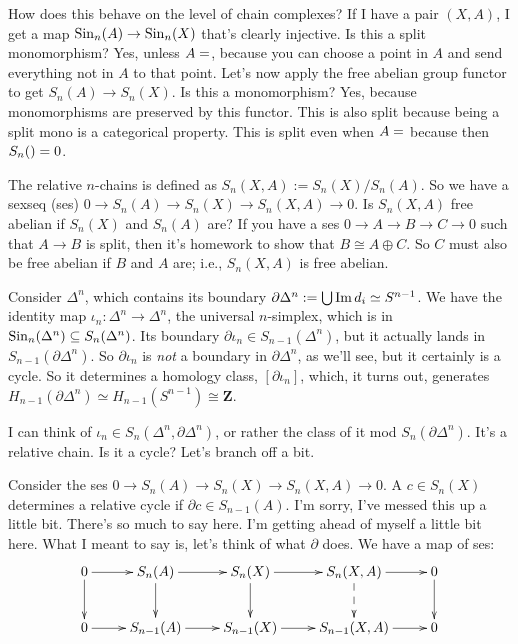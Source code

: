 How does this behave on the level of chain complexes? If I have a pair $(X,A)$, I get a map $\mathrm{Sin}_n(A)\to \mathrm{Sin}_n(X)$ that's clearly injective. Is this a split monomorphism? Yes, unless $A=\empty$, because you can choose a point in $A$ and send everything not in $A$ to that point. Let's now apply the free abelian group functor to get $S_n(A)\to S_n(X)$. Is this a monomorphism? Yes, because monomorphisms are preserved by this functor. This is also split because being a split mono is a categorical property. This is split even when $A=\empty$ because then $S_n(\empty)=0$.
\begin{definition}
The relative $n$-chains is defined as $S_n(X,A):= S_n(X)/S_n(A)$. So we have a sexseq (ses) $0\to S_n(A)\to S_n(X)\to S_n(X,A)\to 0$. Is $S_n(X,A)$ free abelian if $S_n(X)$ and $S_n(A)$ are? If you have a ses $0\to A\to B\to C\to 0$ such that $A\to B$ is split, then it's homework to show that $B\cong A\oplus C$. So $C$ must also be free abelian if $B$ and $A$ are; i.e., $S_n(X,A)$ is free abelian.
\end{definition}
\begin{example}
Consider $\Delta^n$, which contains its boundary $\partial\Delta^n:=\bigcup \operatorname{Im} d_i\simeq S^{n-1}$. We have the identity map $\iota_n:\Delta^n\to \Delta^n$, the universal $n$-simplex, which is in $\mathrm{Sin}_n(\Delta^n)\subseteq S_n(\Delta^n)$. Its boundary $\partial\iota_n\in S_{n-1}(\Delta^n)$, but it actually lands in $S_{n-1}(\partial\Delta^n)$. So $\partial\iota_n$ is \emph{not} a boundary in $\partial\Delta^n$, as we'll see, but it certainly is a cycle. So it determines a homology class, $[\partial\iota_n]$, which, it turns out, generates $ H_{n-1}(\partial\Delta^n)\simeq H_{n-1}(S^{n-1})\cong\mathbf{Z}$.

I can think of $\iota_n\in S_n(\Delta^n,\partial\Delta^n)$, or rather the class of it mod $S_n(\partial\Delta^n)$. It's a relative chain. Is it a cycle? Let's branch off a bit.
\end{example}
Consider the ses $0\to S_n(A)\to S_n(X)\to S_n(X,A)\to 0$. A $c\in S_n(X)$ determines a relative cycle if $\partial c\in S_{n-1}(A)$. I'm sorry, I've messed this up a little bit. There's so much to say here. I'm getting ahead of myself a little bit here. What I meant to say is, let's think of what $\partial$ does. We have a map of ses:
\begin{equation*}
\xymatrix{0\ar[d]\ar[r] & S_n(A)\ar[d]\ar[r] & S_n(X)\ar[d]\ar[r] & S_n(X,A)\ar@{-->}[d]\ar[r] & 0\ar[d]\\
0\ar[r] & S_{n-1}(A)\ar[r] & S_{n-1}(X)\ar[r] & S_{n-1}(X,A)\ar[r] & 0}
\end{equation*}
